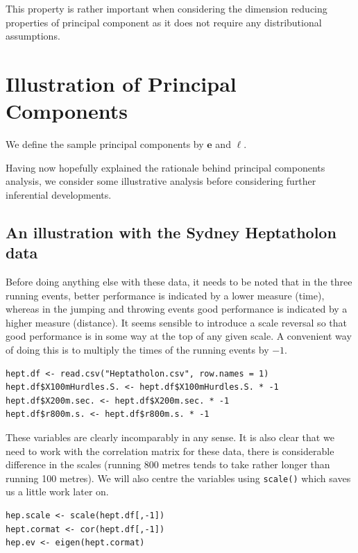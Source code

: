 This property is rather important when considering the dimension reducing properties of principal component as it does not require any distributional assumptions.



\section{Illustration of Principal Components}

 We define the sample principal components by $\boldsymbol{e}$ and $\ell$.

Having now hopefully explained the rationale behind principal components analysis, we consider some illustrative analysis before considering further inferential developments.

\subsection{An illustration with the Sydney Heptatholon data}

Before doing anything else with these data, it needs to be noted that in the three running events, better performance is indicated by a lower measure (time), whereas in the jumping and throwing events good performance is indicated by a higher measure (distance).   It seems sensible to introduce a scale reversal so that good performance is in some way at the top of any given scale.   A convenient way of doing this is to multiply the times of the running events by $-1$.

\singlespacing
\begin{verbatim}
hept.df <- read.csv("Heptatholon.csv", row.names = 1)
hept.df$X100mHurdles.S. <- hept.df$X100mHurdles.S. * -1
hept.df$X200m.sec. <- hept.df$X200m.sec. * -1
hept.df$r800m.s. <- hept.df$r800m.s. * -1
\end{verbatim}
\onehalfspacing

These variables are clearly incomparably in any sense.    It is also clear that we need to work with the correlation matrix for these data, there is considerable difference in the scales (running 800 metres tends to take rather longer than running 100 metres).   We will also centre the variables using \verb+scale()+ which saves us a little work later on.  

\singlespacing
\begin{verbatim}
hep.scale <- scale(hept.df[,-1])
hept.cormat <- cor(hept.df[,-1])
hep.ev <- eigen(hept.cormat)
\end{verbatim}
\onehalfspacing

